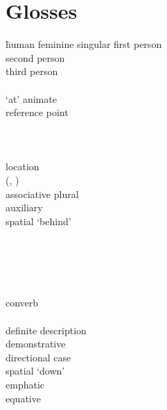 
\section*{Glosses}
	\begin{multicols}{2}
    \largerpage[2]
		\begin{tabbing}
            \hspace{\tabcolsep}\= human feminine singular\kill
				\>	first person\\
				\>	second person\\
				\>	third person\\
				\>	\\
			 \>	 `at' animate \\
			{}		\> reference point\\
				\>	\\
				\>	\\
				\>	\\
				\>	location \\
			{}		\>	(, )\\
				\>	associative plural\\
				\>	auxiliary\\
				\>	spatial  `behind'\\
				\>	\\
				\>	\\
				\>	\\
				\>	\\
				\>	\\
				\>	converb\\
				\>	\\
				\>	definite description\\
				\>	demonstrative\\
				\>	directional case\\
				\>	spatial  `down'\\
				\>	emphatic \\
				\>	equative \\

\end{tabbing}
\end{multicols}
